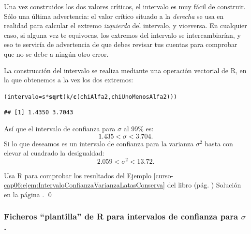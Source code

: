\documentclass[10pt,a4paper]{article}\usepackage[]{graphicx}\usepackage[]{color}
\makeatletter
\newcommand{\hlopt}[1]{\textcolor[rgb]{0,0,0}{#1}}%
\newcommand{\hlstd}[1]{\textcolor[rgb]{0.345,0.345,0.345}{#1}}%
\newcommand{\hlkwb}[1]{\textcolor[rgb]{0.69,0.353,0.396}{#1}}%
\newcommand{\hlkwd}[1]{\textcolor[rgb]{0.737,0.353,0.396}{\textbf{#1}}}%
\newenvironment{kframe}{%
 \def\at@end@of@kframe{}%
 \ifinner\ifhmode%
  \def\at@end@of@kframe{\end{minipage}}%
  \begin{minipage}{\columnwidth}%
 \fi\fi%
 \def\FrameCommand##1{\hskip\@totalleftmargin \hskip-\fboxsep
 \colorbox{shadecolor}{##1}\hskip-\fboxsep
     \hskip-\linewidth \hskip-\@totalleftmargin \hskip\columnwidth}%
 \MakeFramed {\advance\hsize-\width
   \@totalleftmargin\z@ \linewidth\hsize
   \@setminipage}}%
 {\par\unskip\endMakeFramed%
 \at@end@of@kframe}
\newenvironment{knitrout}{}{} %
\makeatother
\begin{document}
Una vez construidos los dos valores críticos, el intervalo es muy fácil de construir. Sólo una última advertencia: el valor crítico situado a la {\em derecha} se usa en realidad para calcular el extremo {\em izquierdo} del intervalo, y viceversa. En cualquier caso, si alguna vez te equivocas, los extremos del intervalo se intercambiarían, y eso te serviría de advertencia de que debes revisar tus cuentas para comprobar que no se debe a ningún otro error.

La construcción del intervalo se realiza mediante una operación vectorial de R, en la que obtenemos a la vez los dos extremos:
\begin{knitrout}
\color{fgcolor}\begin{kframe}
\begin{alltt}
\hlstd{(intervalo} \hlkwb{=} \hlstd{s} \hlopt{*} \hlkwd{sqrt}\hlstd{(k} \hlopt{/} \hlkwd{c}\hlstd{(chiAlfa2, chiUnoMenosAlfa2)))}
\end{alltt}
\begin{verbatim}
## [1] 1.4350 3.7043
\end{verbatim}
\end{kframe}
\end{knitrout}
Así que el intervalo de confianza para $\sigma$ al $99\%$ es:
\[1.435 < \sigma < 3.704.\]
Si lo que deseamos es un intervalo de confianza para la varianza $\sigma^2$ basta con elevar al cuadrado la desigualdad:
\[2.059 < \sigma^2 < 13.72.\]

\begin{ejercicio}
\label{tut06:ejercicio21}
Usa R para comprobar los resultados del Ejemplo \ref{curso-cap06:ejem:IntervaloConfianzaVarianzaLatasConserva}  del libro (pág. \pageref{curso-cap06:ejem:IntervaloConfianzaVarianzaLatasConserva})
Solución en la página \pageref{tut06:ejercicio21:sol}.
\qed
\end{ejercicio}



\subsubsection*{Ficheros ``plantilla'' de R para intervalos de confianza para $\sigma$.}
\end{document}
